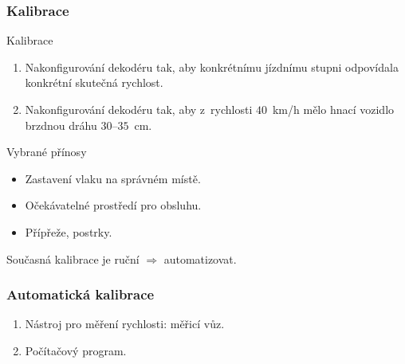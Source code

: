 \documentclass[aspectratio=169]{beamer}
\begin{document}
\begin{frame}
\frametitle{Kalibrace}
\begin{block}{Kalibrace}
\begin{enumerate}
\item Nakonfigurování dekodéru tak, aby konkrétnímu jízdnímu stupni odpovídala
konkrétní skutečná rychlost.
\item Nakonfigurování dekodéru tak, aby z~rychlosti $40$~km/h mělo hnací vozidlo
brzdnou dráhu $30$--$35$~cm.
\end{enumerate}
\end{block}

\pause

\begin{block}{Vybrané přínosy}
\begin{itemize}
\item Zastavení vlaku na správném místě.
\item Očekávatelné prostředí pro obsluhu.
\item Přípřeže, postrky.
\end{itemize}
\end{block}

Současná kalibrace je ruční $\Rightarrow$ automatizovat.
\end{frame}


\begin{frame}
\frametitle{Automatická kalibrace}
\begin{enumerate}
\item Nástroj pro měření rychlosti: měřicí vůz.
\item Počítačový program.
\end{enumerate}
\end{frame}

\end{document}
